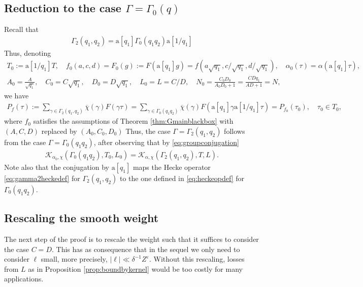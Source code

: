 \documentclass[12pt]{amsart}
\theoremstyle{definition}
\theoremstyle{remark}
\numberwithin{equation}{section}
\newcommand{\1}{{\mathbf 1}}
\newcommand{\eps}{\varepsilon}
\renewcommand{\a}{\mathrm{a}}
\begin{document}
\subsection{Reduction to the case $\Gamma=\Gamma_0(q)$}
Recall that
\begin{align} \label{eq:groupconjugation}
 \Gamma_2(q_1,q_2) = \mathrm{a}[q_1]  \Gamma_0(q_1q_2) \mathrm{a}[1/q_1]   
\end{align}
Thus, denoting
\begin{align*}
    T_0 :=  \mathrm{a}[1/q_1] T, \quad f_0(a,c,d)=F_0(g) := F(\mathrm{a}[q_1] g) = f(a \sqrt{q_1}, c/ \sqrt{q_1}, d/ \sqrt{q_1}), \quad \alpha_0(\tau) = \alpha( \mathrm{a}[q_1]\tau), \\
    A_0 = \frac{A}{\sqrt{q_1}}, \quad C_0 = C \sqrt{q_1}, \quad D_0 = D \sqrt{q_1}, \quad L_0 = L = C/D, \quad N_0 = \frac{C_0D_0}{A_0D_0 +1} =  \frac{CD q_1 }{AD +1} = N, 
\end{align*}
we have
\begin{align*}
  P_{f}(\tau) := \sum_{\gamma \in \Gamma_2(q_1,q_2)} \overline{\chi}(\gamma) F(\gamma \tau) =  \sum_{\gamma \in \Gamma_0(q_1q_2)} \overline{\chi}(\gamma) F(\mathrm{a}[q_1] \gamma\mathrm{a}[1/q_1] \tau) =   P_{f_0}(\tau_0 ) , \quad \tau_0 \in T_0,
\end{align*}
where $f_0$ satisfies the assumptions of Theorem \ref{thm:Gmainblackbox} with $(A,C,D)$ replaced by $(A_0,C_0,D_0)$
Thus, the case $\Gamma = \Gamma_2(q_1,q_2)$ follows from the case $\Gamma = \Gamma_0(q_1q_2)$, after observing that by \eqref{eq:groupconjugation}
\begin{align*}
    \mathcal{K}_{\alpha_0,\chi}(\Gamma_0(q_1q_2),T_0,L_0) = \mathcal{K}_{\alpha,\chi}(\Gamma_2(q_1,q_2),T,L).
\end{align*}
Note also that the conjugation by $\a[q_1]$ maps the Hecke operator \eqref{eq:gamma2heckedef} for $\Gamma_2(q_1,q_2)$ to the one defined in \eqref{eq:heckeopdef} for $\Gamma_0(q_1q_2)$.


\subsection{Rescaling the smooth weight}
The next step of the proof is to rescale the weight such that it suffices to consider the case $C=D$. This has as consequence that in the sequel we only need to consider $\ell$ small, more precisely, $|\ell|\ll \delta^{-1} Z^\eps$. Without this rescaling, losses from $L$ as in Proposition \ref{prop:boundbykernel} would be too costly for many applications. 
\end{document}
